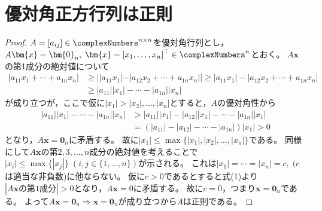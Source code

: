     \section{優対角正方行列は正則}
        \begin{proof}
            \quad\par
            $A=[a_{ij}]\in\complexNumbers^{n\times n}$を優対角行列とし，$A\bm{x}=\bm{0}_n,\;\bm{x}=[x_1,\dotsc,x_n]^\top\in\complexNumbers^n$とおく。
            $A\bm{x}$の第1成分の絶対値について
            \begin{align*}
                |a_{11}x_1 + \dotsb + a_{1n}x_n| &\geq ||a_{11}x_1| - |a_{12}x_2 + \dotsb + a_{1n}x_n|| \geq |a_{11}x_1| - |a_{12}x_2 + \dotsb + a_{1n}x_n| \\
                & \geq |a_{11}||x_1| - \dotsb - |a_{1n}||x_n|
            \end{align*}
            が成り立つが，ここで仮に$|x_1| > |x_2|,\dotsc,|x_n|$とすると，$A$の優対角性から
            \begin{align*}
                |a_{11}||x_1| - \dotsb - |a_{1n}||x_n| &> |a_{11}||x_1| - |a_{12}||x_1| - \dotsb - |a_{1n}||x_1| \\
                &= (|a_{11}| - |a_{12}| - \dotsb - |a_{1n}|)|x_1| > 0 \tag{1}
            \end{align*}
            となり，$A\bm{x}=\bm{0}_n$に矛盾する。
            故に$|x_1| \leq \max\{|x_1|,|x_2|,\dotsc,|x_n|\}$である。
            同様にして$A\bm{x}$の第$2,3,\dotsc,n$成分の絶対値を考えることで$|x_i| \leq \max\{|x_j|\}\;(i,j\in\{1,\dotsc,n\})$が示される。
            これは$|x_1|=\dotsb=|x_n|=c,\;(c$は適当な非負数)に他ならない。
            仮に$c>0$であるとすると式(1)より$|A\bm{x}\text{の第1成分}| > 0$となり，$A\bm{x}=0$に矛盾する。
            故に$c=0$，つまり$\bm{x}=\bm{0}_n$である。
            よって$A\bm{x}=\bm{0}_n \Rightarrow \bm{x}=\bm{0}_n$が成り立つから$A$は正則である。
        \end{proof}
